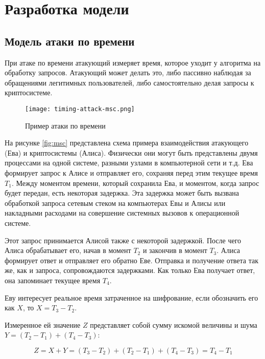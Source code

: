 \section{Разработка модели} \label{sec:timing}

\subsection{Модель атаки по времени}

При атаке по времени атакующий измеряет время, которое уходит у алгоритма на
обработку запросов. Атакующий может делать это, либо пассивно наблюдая за
обращениями легитимных пользователей, либо самостоятельно делая запросы к
криптосистеме.

\begin{figure}[h]
    \centering
    \texttt{[image: timing-attack-msc.png]}
    \caption{Пример атаки по времени}
\end{figure} \label{fig:msc}

На рисунке \ref{fig:msc} представлена схема примера взаимодействия
атакующего (Ева) и криптосистемы (Алиса). Физически они могут быть представлены
двумя процессами на одной системе, разными узлами в компьютерной сети и т.д.
Ева формирует запрос к Алисе и отправляет его, сохраняя перед этим текущее
время $T_1$. Между моментом времени, который сохранила Ева, и моментом, когда
запрос будет передан, есть некоторая задержка. Эта задержка может быть вызвана
обработкой запроса сетевым стеком на компьютерах Евы и Алисы или накладными
расходами на совершение системных вызовов к операционной системе.

Этот запрос принимается Алисой также с некоторой задержкой. После чего Алиса
обрабатывает его, начав в момент $T_2$ и закончив в момент $T_3$. Алиса
формирует ответ и отправляет его обратно Еве. Отправка и получение ответа так
же, как и запроса, сопровождаются задержками. Как только Ева получает ответ, она
запоминает текущее время $T_4$.

Еву интересует реальное время затраченное на шифрование, если обозначить его как
$X$, то $X = T_3 - T_2$.

Измеренное ей значение $Z$ представляет собой сумму искомой величины и шума
$Y = (T_2 - T_1) + (T_4 - T_3)$:

\begin{equation}
Z = X + Y = (T_3 - T_2) + (T_2 - T_1) + (T_4 - T_3) = T_4 - T_1
\end{equation} \label{eq:noise}

